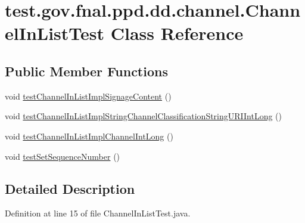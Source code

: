 \hypertarget{classtest_1_1gov_1_1fnal_1_1ppd_1_1dd_1_1channel_1_1ChannelInListTest}{\section{test.\-gov.\-fnal.\-ppd.\-dd.\-channel.\-Channel\-In\-List\-Test Class Reference}
\label{classtest_1_1gov_1_1fnal_1_1ppd_1_1dd_1_1channel_1_1ChannelInListTest}
}
\subsection*{Public Member Functions}
\begin{DoxyCompactItemize}
\item 
void \hyperlink{classtest_1_1gov_1_1fnal_1_1ppd_1_1dd_1_1channel_1_1ChannelInListTest_a2bcc4b72006187abddd87528e7ea959d}{test\-Channel\-In\-List\-Impl\-Signage\-Content} ()
\item 
void \hyperlink{classtest_1_1gov_1_1fnal_1_1ppd_1_1dd_1_1channel_1_1ChannelInListTest_a5e7d302450f7aec76a94b96781404ab6}{test\-Channel\-In\-List\-Impl\-String\-Channel\-Classification\-String\-U\-R\-I\-Int\-Long} ()
\item 
void \hyperlink{classtest_1_1gov_1_1fnal_1_1ppd_1_1dd_1_1channel_1_1ChannelInListTest_aee88b93d2126b4b30ac17e5b1830687a}{test\-Channel\-In\-List\-Impl\-Channel\-Int\-Long} ()
\item 
void \hyperlink{classtest_1_1gov_1_1fnal_1_1ppd_1_1dd_1_1channel_1_1ChannelInListTest_abf6a6df06cd8c86afb8ff5ca4da14591}{test\-Set\-Sequence\-Number} ()
\end{DoxyCompactItemize}


\subsection{Detailed Description}


Definition at line 15 of file Channel\-In\-List\-Test.\-java.



